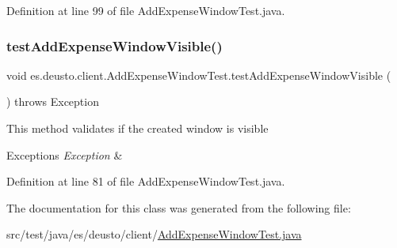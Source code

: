 Definition at line 99 of file Add\+Expense\+Window\+Test.\+java.

\mbox{\label{classes_1_1deusto_1_1client_1_1_add_expense_window_test_abde6a6bf7c49590ba9bcf9e466193ff0}} 
\subsubsection{\texorpdfstring{test\+Add\+Expense\+Window\+Visible()}{testAddExpenseWindowVisible()}}
{\footnotesize\ttfamily void es.\+deusto.\+client.\+Add\+Expense\+Window\+Test.\+test\+Add\+Expense\+Window\+Visible (\begin{DoxyParamCaption}{ }\end{DoxyParamCaption}) throws Exception}

This method validates if the created window is visible


\begin{DoxyExceptions}{Exceptions}
{\em Exception} & \\
\hline
\end{DoxyExceptions}


Definition at line 81 of file Add\+Expense\+Window\+Test.\+java.



The documentation for this class was generated from the following file\+:\begin{DoxyCompactItemize}
\item 
src/test/java/es/deusto/client/\hyperlink{_add_expense_window_test_8java}{Add\+Expense\+Window\+Test.\+java}\end{DoxyCompactItemize}
